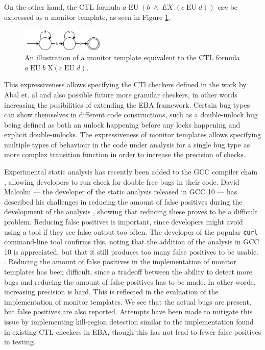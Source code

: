 \newpar On the other hand, the CTL formula $a\;\text{EU}\;(b\;\land\;EX\;(c\;\text{EU}\;d))$ \textit{can} be expressed as a monitor template, as seen in Figure \ref{ctl-as-monitor}. 

\begin{figure}[H]
    \centering
    \includegraphics[width=0.35\textwidth]{evaluation/figures/ctl-as-monitor}
    \caption{An illustration of a monitor template equivalent to the CTL formula $a\;\text{EU}\;b\;\text{X}(c\;\text{EU}\;d)$.}
    \label{ctl-as-monitor}
\end{figure}

\newpar This expressiveness allows specifying the CTl checkers defined in the work by Abal et. al and also possible future more granular checkers, in other words increasing the posibilities of extending the EBA framework. Certain bug types can show themselves in different code constructions, such as a double-unlock bug being defined as both an unlock happening before any locks happening and explicit double-unlocks. The expressiveness of monitor templates allows specifying multiple types of behaviour in the code under analysis for a single bug type as more complex transition function in order to increase the precision of checks.

\newpar Experimental static analysis has recently been added to the GCC compiler chain \cite{gcc10}, allowing developers to run check for double-free bugs in their code. David Malcolm --- the developer of the static analysis released in GCC 10 --- has described his challenges in reducing the amount of false positives during the development of the analysis \cite{gcc10-development}, showing that reducing these proves to be a difficult problem. Reducing false positives is important, since developers might avoid using a tool if they see false output too often. The developer of the popular \texttt{curl} command-line tool confirms this, noting that the addition of the analysis in GCC 10 is appreciated, but that it still produces too many false positives to be usable. \cite{curl-static-analysis}. Reducing the amount of false positives in the implementation of monitor templates has been difficult, since a tradeoff between the ability to detect more bugs and reducing the amount of false positives has to be made. In other words, increasing precision is hard. This is reflected in the evaluation of the implementation of monitor templates. We see that the actual bugs are present, but false positives are also reported. Attempts have been made to mitigate this issue by implementing kill-region detection similar to the implementation found in existing CTL checkers in EBA, though this has not lead to fewer false positives in testing.  

